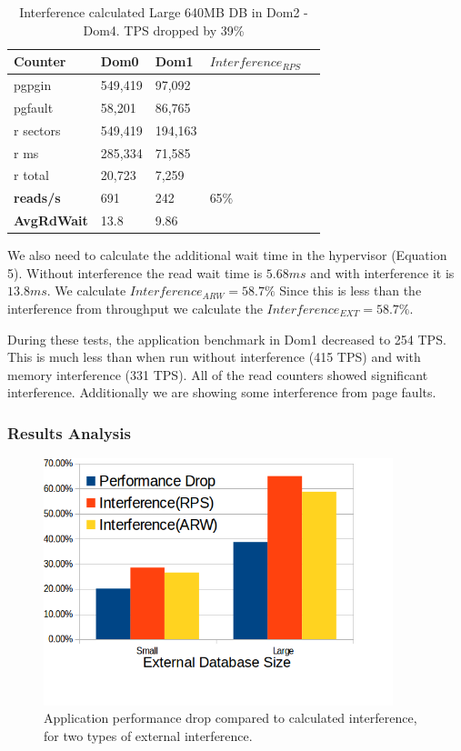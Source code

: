 \begin{table}[h]
\begin{tabular}{ l l l l p{5cm} }
  Counter     & Dom0    & Dom1    & $Interference_{RPS}$ \\
  \hline
	pgpgin    & 549,419 & 97,092 &  \\
	pgfault   &  58,201 & 86,765 &  \\
	r sectors & 549,419 &194,163 &  \\
	r ms      & 285,334 & 71,585 &  \\
	r total   &  20,723 &  7,259 &  \\
    \textbf{reads/s}    & 691 & 242 &   65\% \\
    \textbf{AvgRdWait}  & 13.8 & 9.86 &  \\ 
  \hline
\end{tabular}
\caption{Interference calculated Large 640MB DB in Dom2 - Dom4.  TPS dropped by 39\%}
\label{fig:InterferenceLg}
\end{table}
We also need to calculate the additional wait time in the hypervisor (Equation 5).  Without interference the read wait time is $5.68 ms$ and with interference it is $13.8 ms$.  We calculate $Interference_{ARW} = 58.7\%$  Since this is less than the interference from throughput we calculate the $Interference_{EXT} = 58.7\%$.

During these tests, the application benchmark in Dom1 decreased to 254 TPS.  This is much less than when run without interference (415 TPS) and with memory interference (331 TPS).  All of the read counters showed significant interference.  Additionally we are showing some interference from page faults.  

\subsubsection{Results Analysis}

\begin{figure}[!h]
  \begin{center}
  \includegraphics[width=4in]{images/IBM_PerfDrop_Int.png}
  \caption{Application performance drop compared to calculated interference, for two types of external interference.}
  \label{fig:perfDrop}
  \end{center}
\end{figure}

